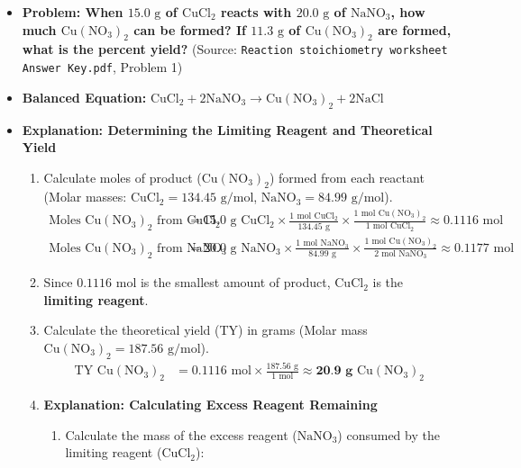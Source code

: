\documentclass{article}
\begin{document}
\begin{itemize}
    \item \textbf{Problem: When $15.0 \text{ g}$ of $\text{CuCl}_2$ reacts with $20.0 \text{ g}$ of $\text{NaNO}_3$, how much $\text{Cu}(\text{NO}_3)_2$ can be formed? If $11.3 \text{ g}$ of $\text{Cu}(\text{NO}_3)_2$ are formed, what is the percent yield?} (Source: \texttt{Reaction stoichiometry worksheet Answer Key.pdf}, Problem 1)

    \item \textbf{Balanced Equation:} $\text{CuCl}_2 + 2\text{NaNO}_3 \rightarrow \text{Cu}(\text{NO}_3)_2 + 2\text{NaCl}$

    \item \textbf{Explanation: Determining the Limiting Reagent and Theoretical Yield}
    \begin{enumerate}
        \item Calculate moles of product ($\text{Cu}(\text{NO}_3)_2$) formed from each reactant (Molar masses: $\text{CuCl}_2 = 134.45 \text{ g/mol}$, $\text{NaNO}_3 = 84.99 \text{ g/mol}$).
        \begin{align*}
            \text{Moles Cu}(\text{NO}_3)_2 \text{ from CuCl}_2 &= 15.0 \text{ g } \text{CuCl}_2 \times \frac{1 \text{ mol } \text{CuCl}_2}{134.45 \text{ g}} \times \frac{1 \text{ mol } \text{Cu}(\text{NO}_3)_2}{1 \text{ mol } \text{CuCl}_2} \approx 0.1116 \text{ mol} \\
            \text{Moles Cu}(\text{NO}_3)_2 \text{ from NaNO}_3 &= 20.0 \text{ g } \text{NaNO}_3 \times \frac{1 \text{ mol } \text{NaNO}_3}{84.99 \text{ g}} \times \frac{1 \text{ mol } \text{Cu}(\text{NO}_3)_2}{2 \text{ mol } \text{NaNO}_3} \approx 0.1177 \text{ mol}
        \end{align*}
        \item Since $0.1116 \text{ mol}$ is the smallest amount of product, $\text{CuCl}_2$ is the \textbf{limiting reagent}.
        \item Calculate the theoretical yield (TY) in grams (Molar mass $\text{Cu}(\text{NO}_3)_2 = 187.56 \text{ g/mol}$).
        \begin{align*}
            \text{TY } \text{Cu}(\text{NO}_3)_2 &= 0.1116 \text{ mol} \times \frac{187.56 \text{ g}}{1 \text{ mol}} \approx \textbf{20.9 g } \text{Cu}(\text{NO}_3)_2
        \end{align*}
    \item \textbf{Explanation: Calculating Excess Reagent Remaining}
    \begin{enumerate}
        \item Calculate the mass of the excess reagent ($\text{NaNO}_3$) consumed by the limiting reagent ($\text{CuCl}_2$):

\end{enumerate}
\end{enumerate}
\end{itemize}
\end{document}
